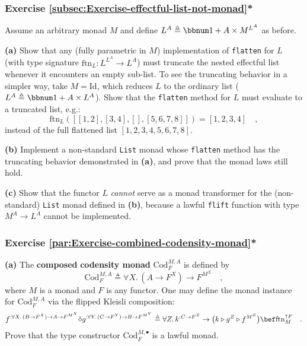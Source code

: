 \subsubsection{Exercise \label{subsec:Exercise-effectful-list-not-monad}\ref{subsec:Exercise-effectful-list-not-monad}{*}}

Assume an arbitrary monad $M$ and define $L^{A}\triangleq\bbnum 1+A\times M^{L^{A}}$
as before.

\textbf{(a)} Show that any (fully parametric in $M$) implementation
of \lstinline!flatten! for $L$ (with type signature $\text{ftn}_{L}:L^{L^{A}}\rightarrow L^{A}$)
must truncate the nested effectful list whenever it encounters an
empty sub-list. To see the truncating behavior in a simpler way, take
$M=\text{Id}$, which reduces $L$ to the ordinary list ($L^{A}\triangleq\bbnum 1+A\times L^{A}$).
Show that the \lstinline!flatten! method for $L$ must evaluate to
a truncated list, e.g.:
\[
\text{ftn}_{L}(\left[\left[1,2\right],\left[3,4\right],\left[\right],\left[5,6,7,8\right]\right])=\left[1,2,3,4\right]\quad,
\]
instead of the full flattened list $\left[1,2,3,4,5,6,7,8\right]$. 

\textbf{(b)} Implement a non-standard \lstinline!List! monad whose
\lstinline!flatten! method has the truncating behavior demonstrated
in \textbf{(a)}, and prove that the monad laws still hold.

\textbf{(c)} Show that the functor $L$ \emph{cannot} serve as a monad
transformer for the (non-standard) \lstinline!List! monad defined
in \textbf{(b)}, because a lawful \lstinline!flift! function with
type $M^{A}\rightarrow L^{A}$ cannot be implemented.


\subsubsection{Exercise \label{par:Exercise-combined-codensity-monad}\ref{par:Exercise-combined-codensity-monad}{*}}

\textbf{(a)} The \textbf{composed} \textbf{codensity
monad} $\text{Cod}_{F}^{M,A}$ is defined by
\[
\text{Cod}_{F}^{M,A}\triangleq\forall X.\,(A\rightarrow F^{X})\rightarrow F^{M^{X}}\quad,
\]
where $M$ is a monad and $F$ is any functor. One may define the
monad instance for $\text{Cod}_{F}^{M,A}$ via the flipped Kleisli
composition:
\[
f^{:\forall X.\,(B\rightarrow F^{X})\rightarrow A\rightarrow F^{M^{X}}}\tilde{\diamond}g^{:\forall Y.\,(C\rightarrow F^{Y})\rightarrow B\rightarrow F^{M^{Y}}}\triangleq\forall Z.\,k^{:C\rightarrow F^{Z}}\rightarrow\big(k\triangleright g^{Z}\triangleright f^{M^{Z}}\big)\bef\text{ftn}_{M}^{\uparrow F}\quad.
\]
Prove that the type constructor $\text{Cod}_{F}^{M,\bullet}$ is a
lawful monad.

